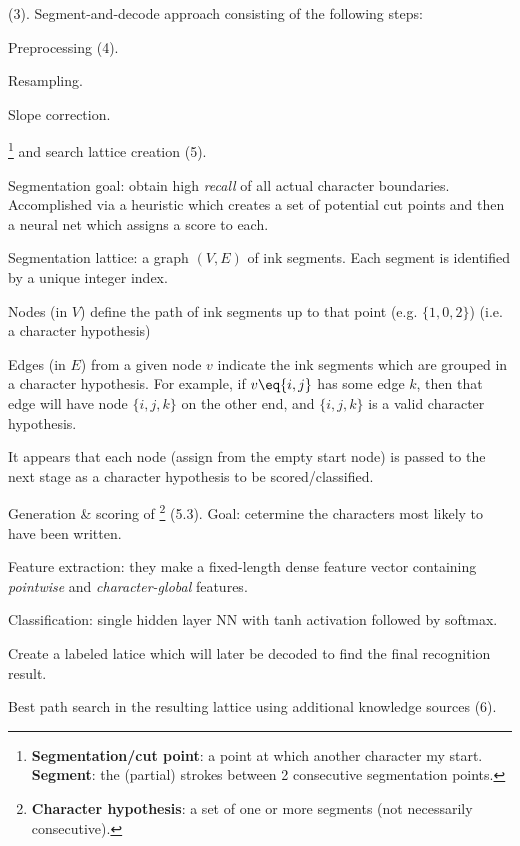 \documentclass[11pt]{article}
\begin{document}
 (3). Segment-and-decode approach consisting of the following steps:
\begin{compactitem}
	\item Preprocessing (4).
	\begin{compactenum}
		\item Resampling. 
		\item Slope correction.
	\end{compactenum}
	
	\item {}\footnote{\textbf{Segmentation/cut point}: a point at which another character my start. \textbf{Segment}: the (partial) strokes between 2 consecutive segmentation points.} and search lattice creation (5).
	\begin{compactenum}
		\item Segmentation goal: obtain high \textit{recall} of all actual character boundaries. Accomplished via a heuristic which creates a set of potential cut points and then a neural net which assigns a score to each.
		
		\item Segmentation lattice: a graph $(V, E)$ of ink segments. Each segment is identified by a unique integer index. 
		\begin{compactitem}
			\item Nodes (in $V$) define the path of ink segments up to that point (e.g. $\{1, 0, 2\}$) (i.e. a character hypothesis)
			\item Edges (in $E$) from a given node $v$ indicate the ink segments which are grouped in a character hypothesis. For example, if $v\eq\{i, j\}$ has some edge $k$, then that edge will have node $\{i, j, k\}$ on the other end, and $\{i, j, k\}$ is a valid character hypothesis. 
		\end{compactitem}
		It appears that each node (assign from the empty start node) is passed to the next stage as a character hypothesis to be scored/classified.
	\end{compactenum}
	
	\item Generation \& scoring of \footnote{\textbf{Character hypothesis}: a set of one or more segments (not necessarily consecutive).} (5.3). Goal: cetermine the characters most likely to have been written.
	\begin{compactenum}
		\item Feature extraction: they make a fixed-length dense feature vector containing \textit{pointwise} and \textit{character-global} features.
		
		\item Classification: single hidden layer NN with tanh activation followed by softmax.
		
		\item Create a labeled latice which will later be decoded to find the final recognition result.
	\end{compactenum}
	
	\item Best path search in the resulting lattice using additional knowledge sources (6). 
\end{compactitem}
\end{document}
